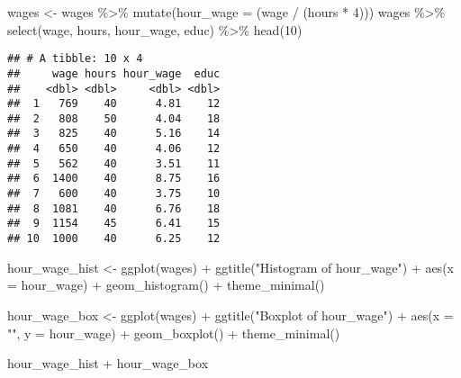\documentclass[
]{article}
\newenvironment{Shaded}{\begin{snugshade}}{\end{snugshade}}
\newcommand{\AttributeTok}[1]{\textcolor[rgb]{0.77,0.63,0.00}{#1}}
\newcommand{\DecValTok}[1]{\textcolor[rgb]{0.00,0.00,0.81}{#1}}
\newcommand{\FunctionTok}[1]{\textcolor[rgb]{0.00,0.00,0.00}{#1}}
\newcommand{\NormalTok}[1]{#1}
\newcommand{\OtherTok}[1]{\textcolor[rgb]{0.56,0.35,0.01}{#1}}
\newcommand{\SpecialCharTok}[1]{\textcolor[rgb]{0.00,0.00,0.00}{#1}}
\newcommand{\StringTok}[1]{\textcolor[rgb]{0.31,0.60,0.02}{#1}}
\begin{document}
\begin{Shaded}
\begin{Highlighting}[]
\NormalTok{wages }\OtherTok{\textless{}{-}}\NormalTok{ wages }\SpecialCharTok{\%\textgreater{}\%} \FunctionTok{mutate}\NormalTok{(}\AttributeTok{hour\_wage =}\NormalTok{ (wage }\SpecialCharTok{/}\NormalTok{ (hours }\SpecialCharTok{*} \DecValTok{4}\NormalTok{)))}
\NormalTok{wages }\SpecialCharTok{\%\textgreater{}\%} \FunctionTok{select}\NormalTok{(wage, hours, hour\_wage, educ) }\SpecialCharTok{\%\textgreater{}\%} \FunctionTok{head}\NormalTok{(}\DecValTok{10}\NormalTok{)}
\end{Highlighting}
\end{Shaded}

\begin{verbatim}
## # A tibble: 10 x 4
##     wage hours hour_wage  educ
##    <dbl> <dbl>     <dbl> <dbl>
##  1   769    40      4.81    12
##  2   808    50      4.04    18
##  3   825    40      5.16    14
##  4   650    40      4.06    12
##  5   562    40      3.51    11
##  6  1400    40      8.75    16
##  7   600    40      3.75    10
##  8  1081    40      6.76    18
##  9  1154    45      6.41    15
## 10  1000    40      6.25    12
\end{verbatim}

\begin{Shaded}
\begin{Highlighting}[]
\NormalTok{hour\_wage\_hist }\OtherTok{\textless{}{-}} \FunctionTok{ggplot}\NormalTok{(wages) }\SpecialCharTok{+} \FunctionTok{ggtitle}\NormalTok{(}\StringTok{"Histogram of hour\_wage"}\NormalTok{) }\SpecialCharTok{+} \FunctionTok{aes}\NormalTok{(}\AttributeTok{x =}\NormalTok{ hour\_wage) }\SpecialCharTok{+} \FunctionTok{geom\_histogram}\NormalTok{() }\SpecialCharTok{+} \FunctionTok{theme\_minimal}\NormalTok{()}

\NormalTok{hour\_wage\_box }\OtherTok{\textless{}{-}} \FunctionTok{ggplot}\NormalTok{(wages) }\SpecialCharTok{+} \FunctionTok{ggtitle}\NormalTok{(}\StringTok{"Boxplot of hour\_wage"}\NormalTok{) }\SpecialCharTok{+} \FunctionTok{aes}\NormalTok{(}\AttributeTok{x =} \StringTok{""}\NormalTok{, }\AttributeTok{y =}\NormalTok{ hour\_wage) }\SpecialCharTok{+} \FunctionTok{geom\_boxplot}\NormalTok{() }\SpecialCharTok{+} \FunctionTok{theme\_minimal}\NormalTok{()}

\NormalTok{hour\_wage\_hist }\SpecialCharTok{+}\NormalTok{ hour\_wage\_box}
\end{Highlighting}
\end{Shaded}
\end{document}
